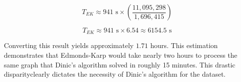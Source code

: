 \documentclass[12pt,a4paper]{article}
\begin{document}
\begin{equation}
    T_{EK} \approx 941\text{ s} \times \left( \frac{11,095,298}{1,696,415} \right)
\end{equation}

\begin{equation*}
    T_{EK} \approx 941\text{ s} \times 6.54 \approx 6154.5\text{ s}
\end{equation*}

Converting this result yields approximately $1.71$ hours. This estimation demonstrates that Edmonds-Karp would take nearly two hours to process the same graph that Dinic's algorithm solved in roughly 15 minutes. This drastic disparityclearly dictates the necessity of Dinic's algorithm for the dataset.

\pagebreak
\end{document}
